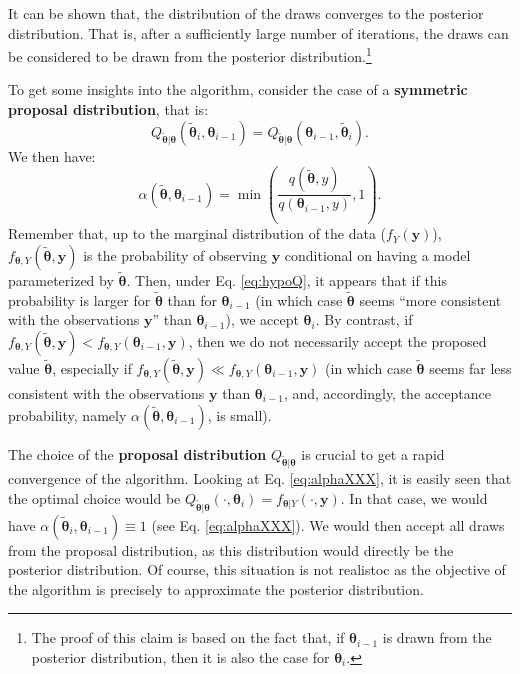\documentclass[
  12pt,
]{book}
\theoremstyle{definition}
\theoremstyle{definition}
\theoremstyle{definition}
\theoremstyle{definition}
\theoremstyle{remark}
\begin{document}
It can be shown that, the distribution of the draws converges to the posterior distribution. That is, after a sufficiently large number of iterations, the draws can be considered to be drawn from the posterior distribution.\footnote{The proof of this claim is based on the fact that, if \({\boldsymbol\theta}_{i-1}\) is drawn from the posterior distribution, then it is also the case for \({\boldsymbol\theta}_i\).}

To get some insights into the algorithm, consider the case of a \textbf{symmetric proposal distribution}, that is:
\begin{equation}
Q_{\tilde{{\boldsymbol\theta}}|{\boldsymbol\theta}}(\tilde{{\boldsymbol\theta}}_i,{\boldsymbol\theta}_{i-1})=Q_{\tilde{{\boldsymbol\theta}}|{\boldsymbol\theta}}({\boldsymbol\theta}_{i-1},\tilde{{\boldsymbol\theta}}_i).\label{eq:symmQ}
\end{equation}
We then have:
\begin{equation}
\alpha(\tilde{{\boldsymbol\theta}},{\boldsymbol\theta}_{i-1})= \min\left(\frac{q(\tilde{{\boldsymbol\theta}},y)}{q({\boldsymbol\theta}_{i-1},y)},1\right). \label{eq:hypoQ}
\end{equation}
Remember that, up to the marginal distribution of the data (\(f_Y(\mathbf{y})\)), \(f_{{\boldsymbol\theta},Y}(\tilde{{\boldsymbol\theta}},\mathbf{y})\) is the probability of observing \(\mathbf{y}\) conditional on having a model parameterized by \(\tilde{\boldsymbol\theta}\). Then, under Eq. \eqref{eq:hypoQ}, it appears that if this probability is larger for \(\tilde{\boldsymbol\theta}\) than for \({\boldsymbol\theta}_{i-1}\) (in which case \(\tilde{\boldsymbol\theta}\) seems ``more consistent with the observations \(\mathbf{y}\)'' than \({\boldsymbol\theta}_{i-1}\)), we accept \({\boldsymbol\theta}_i\). By contrast, if \(f_{{\boldsymbol\theta},Y}(\tilde{{\boldsymbol\theta}},\mathbf{y})<f_{{\boldsymbol\theta},Y}({\boldsymbol\theta}_{i-1},\mathbf{y})\), then we do not necessarily accept the proposed value \(\tilde{{\boldsymbol\theta}}\), especially if \(f_{{\boldsymbol\theta},Y}(\tilde{{\boldsymbol\theta}},\mathbf{y})\ll f_{{\boldsymbol\theta},Y}({\boldsymbol\theta}_{i-1},\mathbf{y})\) (in which case \(\tilde{\boldsymbol\theta}\) seems far less consistent with the observations \(\mathbf{y}\) than \({\boldsymbol\theta}_{i-1}\), and, accordingly, the acceptance probability, namely \(\alpha(\tilde{{\boldsymbol\theta}},{\boldsymbol\theta}_{i-1})\), is small).

The choice of the \textbf{proposal distribution} \(Q_{\tilde{\boldsymbol\theta}|{\boldsymbol\theta}}\) is crucial to get a rapid convergence of the algorithm. Looking at Eq. \eqref{eq:alphaXXX}, it is easily seen that the optimal choice would be \(Q_{\tilde{\boldsymbol\theta}|{\boldsymbol\theta}}(\cdot,{\boldsymbol\theta}_i)=f_{{\boldsymbol\theta}|Y}(\cdot,\mathbf{y})\). In that case, we would have \(\alpha(\tilde{{\boldsymbol\theta}}_i,{\boldsymbol\theta}_{i-1})\equiv 1\) (see Eq. \eqref{eq:alphaXXX}). We would then accept all draws from the proposal distribution, as this distribution would directly be the posterior distribution. Of course, this situation is not realistoc as the objective of the algorithm is precisely to approximate the posterior distribution.
\end{document}
